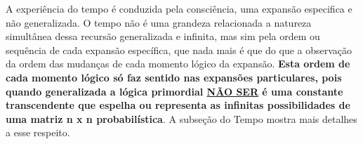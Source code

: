 A experiência do tempo é conduzida pela consciência, uma expansão especifica e não generalizada. O tempo não é uma grandeza relacionada a natureza simultânea dessa recursão generalizada e infinita, mas sim pela ordem ou sequência de cada expansão específica, que nada mais é que do que a observação da ordem das mudanças de cada momento lógico da expansão. \textbf{Esta ordem de cada momento lógico só faz sentido nas expansões particulares, pois quando generalizada a lógica primordial \underline{NÃO SER} é uma constante transcendente que espelha ou representa as infinitas possibilidades de uma matriz n x n probabilística}. A subseção do Tempo mostra mais detalhes a esse respeito.







